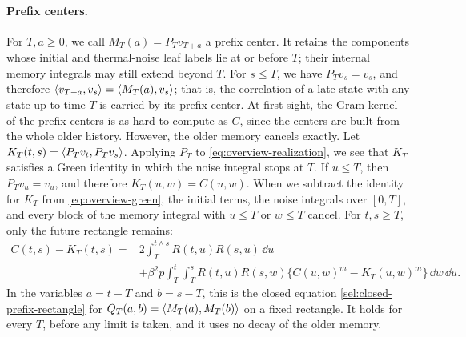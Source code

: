\paragraph{Prefix centers.}
For $T,a\ge0$, we call $M_T(a)=P_Tv_{T+a}$ a prefix center. It retains the components whose initial and thermal-noise leaf labels lie at or before $T$; their internal memory integrals may still extend beyond $T$. For $s\le T$, we have $P_Tv_s=v_s$, and therefore $\left\langle v_{T+a},v_s\right\rangle=\left\langle M_T(a),v_s\right\rangle$; that is, the correlation of a late state with any state up to time $T$ is carried by its prefix center. At first sight, the Gram kernel of the prefix centers is as hard to compute as $C$, since the centers are built from the whole older history. However, the older memory cancels exactly. Let $K_T(t,s)=\left\langle P_Tv_t,P_Tv_s\right\rangle$. Applying $P_T$ to \eqref{eq:overview-realization}, we see that $K_T$ satisfies a Green identity in which the noise integral stops at $T$. If $u\le T$, then $P_Tv_u=v_u$, and therefore $K_T(u,w)=C(u,w)$. When we subtract the identity for $K_T$ from \eqref{eq:overview-green}, the initial terms, the noise integrals over $[0,T]$, and every block of the memory integral with $u\le T$ or $w\le T$ cancel. For $t,s\ge T$, only the future rectangle remains:
\[
\begin{aligned}
 C(t,s)-K_T(t,s)={}&2\int_T^{t\wedge s}R(t,u)R(s,u)\,\dd u\\
 &+\beta^2p\int_T^t\int_T^sR(t,u)R(s,w)\bigl\{C(u,w)^m-K_T(u,w)^m\bigr\}\,\dd w\,\dd u .
\end{aligned}
\]
In the variables $a=t-T$ and $b=s-T$, this is the closed equation \eqref{sel:closed-prefix-rectangle} for $Q_T(a,b)=\left\langle M_T(a),M_T(b)\right\rangle$ on a fixed rectangle. It holds for every $T$, before any limit is taken, and it uses no decay of the older memory.


